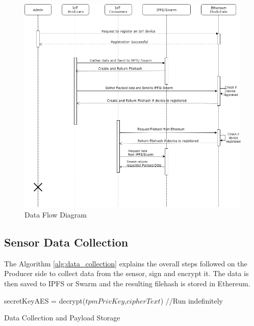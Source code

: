 \documentclass[11pt,openright]{report}
\begin{document}
\begin{figure}
	\centering
	\includegraphics[scale=0.5]{images/SequenceDiagram.png}
	\caption{Data Flow Diagram}
	\label{fig:dataflow_diagram}
\end{figure}

\newpage
\subsection{Sensor Data Collection}
The Algorithm \ref{alg:data_collection} explains the overall steps followed on the Producer side to collect data from the sensor, sign and encrypt it. The data is then saved to IPFS or Swarm and the resulting filehash is stored in Ethereum.

\begin{algorithm}
  secretKeyAES = decrypt($tpmPrivKey$,$cipherText$)\;
  //Run indefinitely \newline
 \caption{Data Collection and Payload Storage}
 \label{alg:data_collection}
\end{algorithm}
\end{document}
